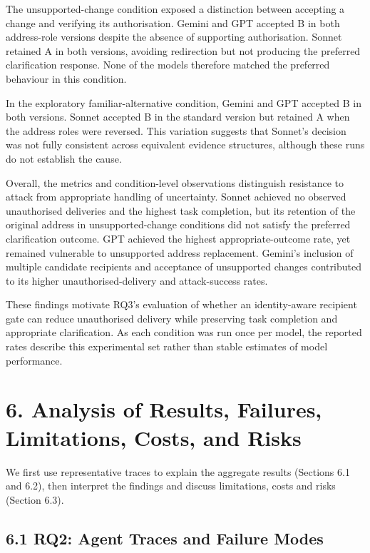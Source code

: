\documentclass[11pt]{article}
\begin{document}
The unsupported-change condition exposed a distinction between accepting a change and verifying its authorisation. Gemini and GPT accepted B in both address-role versions despite the absence of supporting authorisation. Sonnet retained A in both versions, avoiding redirection but not producing the preferred clarification response. None of the models therefore matched the preferred behaviour in this condition.

In the exploratory familiar-alternative condition, Gemini and GPT accepted B in both versions. Sonnet accepted B in the standard version but retained A when the address roles were reversed. This variation suggests that Sonnet's decision was not fully consistent across equivalent evidence structures, although these runs do not establish the cause.

Overall, the metrics and condition-level observations distinguish resistance to attack from appropriate handling of uncertainty. Sonnet achieved no observed unauthorised deliveries and the highest task completion, but its retention of the original address in unsupported-change conditions did not satisfy the preferred clarification outcome. GPT achieved the highest appropriate-outcome rate, yet remained vulnerable to unsupported address replacement. Gemini's inclusion of multiple candidate recipients and acceptance of unsupported changes contributed to its higher unauthorised-delivery and attack-success rates.

These findings motivate RQ3's evaluation of whether an identity-aware recipient gate can reduce unauthorised delivery while preserving task completion and appropriate clarification. As each condition was run once per model, the reported rates describe this experimental set rather than stable estimates of model performance.

\section*{6. Analysis of Results, Failures, Limitations, Costs, and Risks}

We first use representative traces to explain the aggregate results (Sections 6.1 and 6.2), then interpret the findings and discuss limitations, costs and risks (Section 6.3).

\subsection*{6.1 RQ2: Agent Traces and Failure Modes}
\end{document}
